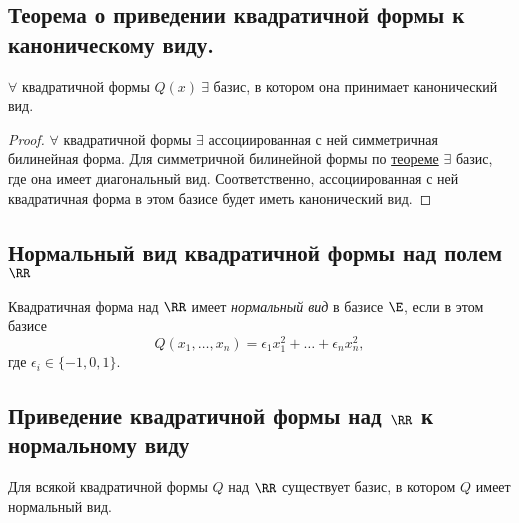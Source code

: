 \subsection{Теорема о приведении квадратичной формы к каноническому виду.}

\begin{theorem}
    $\forall $ квадратичной формы $Q(x) \ \exists$ базис, в котором она принимает канонический вид.
\end{theorem}

\begin{proof}
    $\forall$ квадратичной формы $\exists$ ассоциированная с ней симметричная билинейная форма. Для симметричной билинейной формы по \hyperref[lec19:symmetric_bilinear_form_diagonalization]{теореме} $\exists$ базис, где она имеет диагональный вид. Соответственно, ассоциированная с ней квадратичная форма в этом базисе будет иметь канонический вид.
\end{proof}


\subsection{Нормальный вид квадратичной формы над полем $\RR$}

\begin{definition}
    Квадратичная форма над $\RR$ имеет \textit{нормальный вид} в базисе $\E$, если в этом базисе
    \begin{equation*}
        Q(x_1, \dots, x_n) = \epsilon_1 x_1^2 + \dots + \epsilon_n x_n^2
    ,\end{equation*}
    где $\epsilon_i \in \{-1, 0, 1\}$.
\end{definition}


\subsection{Приведение квадратичной формы над $\RR$ к нормальному виду}

\begin{corollary}
    Для всякой квадратичной формы $Q$ над $\RR$ существует базис, в котором $Q$ имеет нормальный вид.
\end{corollary}

